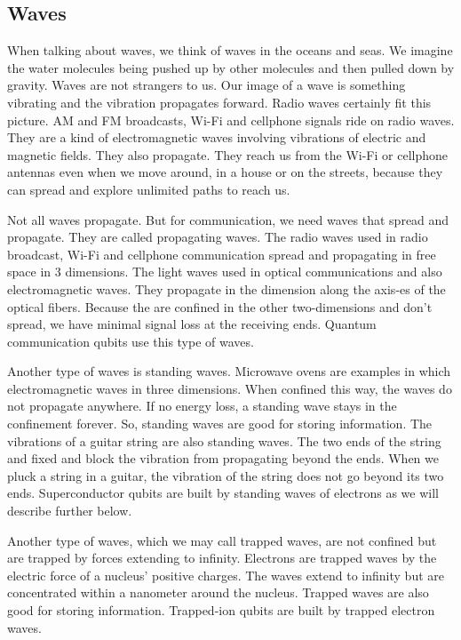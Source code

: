 \documentclass{book}
\begin{document}
\subsection{Waves}
When talking about waves, we think of waves in the oceans and seas. We imagine the water molecules being pushed up by other molecules and then pulled down by gravity. Waves are not strangers to us. Our image of a wave is something vibrating and the vibration propagates forward. Radio waves certainly fit this picture. AM and FM broadcasts, Wi-Fi and cellphone signals ride on radio waves. They are a kind of electromagnetic waves involving vibrations of electric and magnetic fields. They also propagate. They reach us from the Wi-Fi or cellphone antennas even when we move around, in a house or on the streets, because they can spread and explore unlimited paths to reach us.

Not all waves propagate. But for communication, we need waves that spread and propagate. They are called propagating waves. The radio waves used in radio broadcast, Wi-Fi and cellphone communication spread and propagating in free space in 3 dimensions. The light waves used in optical communications and also electromagnetic waves. They propagate in the dimension along the axis-es of the optical fibers. Because the are confined in the other two-dimensions and don't spread, we have minimal signal loss at the receiving ends. Quantum communication qubits use this type of waves.

Another type of waves is standing waves. Microwave ovens are examples in which electromagnetic waves in three dimensions.  When confined this way, the waves do not propagate anywhere. If no energy loss, a standing wave stays in the confinement forever. So, standing waves are good for storing information. The vibrations of a guitar string are also standing waves. The two ends of the string and fixed and block the vibration from propagating beyond the ends. When we pluck a string in a guitar, the vibration of the string does not go beyond its two ends. Superconductor qubits are built by standing waves of electrons as we will describe further below.

Another type of waves, which we may call trapped waves, are not confined but are trapped by forces extending to infinity. Electrons are trapped waves by the electric force of a nucleus' positive charges. The waves extend to infinity but are concentrated within a nanometer around the nucleus. Trapped waves are also good for storing information. Trapped-ion qubits are built by trapped electron waves.
\end{document}
